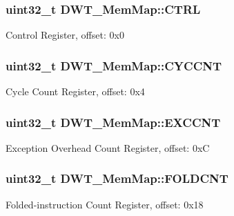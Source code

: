 \subsubsection[{C\+T\+R\+L}]{\setlength{\rightskip}{0pt plus 5cm}uint32\+\_\+t D\+W\+T\+\_\+\+Mem\+Map\+::\+C\+T\+R\+L}\label{struct_d_w_t___mem_map_ab3581abb33e428126e7ec339e66514e4}
Control Register, offset\+: 0x0 \hypertarget{struct_d_w_t___mem_map_adf38ec6a1c7381ff5e894b4f2fc2af1e}{}
\subsubsection[{C\+Y\+C\+C\+N\+T}]{\setlength{\rightskip}{0pt plus 5cm}uint32\+\_\+t D\+W\+T\+\_\+\+Mem\+Map\+::\+C\+Y\+C\+C\+N\+T}\label{struct_d_w_t___mem_map_adf38ec6a1c7381ff5e894b4f2fc2af1e}
Cycle Count Register, offset\+: 0x4 \hypertarget{struct_d_w_t___mem_map_ae76c95a5c70db8790d92dbf9e404e3aa}{}
\subsubsection[{E\+X\+C\+C\+N\+T}]{\setlength{\rightskip}{0pt plus 5cm}uint32\+\_\+t D\+W\+T\+\_\+\+Mem\+Map\+::\+E\+X\+C\+C\+N\+T}\label{struct_d_w_t___mem_map_ae76c95a5c70db8790d92dbf9e404e3aa}
Exception Overhead Count Register, offset\+: 0x\+C \hypertarget{struct_d_w_t___mem_map_a74e31352303671690d8a8e173fae836e}{}
\subsubsection[{F\+O\+L\+D\+C\+N\+T}]{\setlength{\rightskip}{0pt plus 5cm}uint32\+\_\+t D\+W\+T\+\_\+\+Mem\+Map\+::\+F\+O\+L\+D\+C\+N\+T}\label{struct_d_w_t___mem_map_a74e31352303671690d8a8e173fae836e}
Folded-\/instruction Count Register, offset\+: 0x18 \hypertarget{struct_d_w_t___mem_map_ad60c09cefe311e7809d9a57fad402f5c}{}
